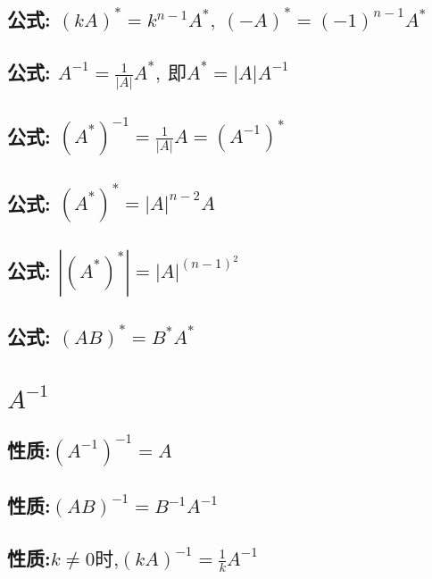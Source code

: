 \documentclass[UTF8]{ctexart}
\begin{document}
		\subsection{公式: $\left( kA \right) ^*=k^{n-1}A^*,\ \left( -A \right) ^*=\left( -1 \right) ^{n-1}A^*			$} 
		

		\subsection{公式: $A^{-1}=\frac{1}{\left| A \right|}A^*,\ \text{即}A^*=\left| A \right|A^{-1}			$} 
		

		\subsection{公式: $\left( A^* \right) ^{-1}=\frac{1}{\left| A \right|}A=\left( A^{-1} \right) ^*			$} 
		

		\subsection{公式: $\left( A^* \right) ^*=\left| A \right|^{n-2}A			$} 
		

		\subsection{公式: $\left| \left( A^* \right) ^* \right|=\left| A \right|^{\left( n-1 \right) ^2}			$} 
		

		\subsection{公式: $\left( AB \right) ^*=B^*A^*$} 
		

	
	
	
	
	\section{$A^{-1}$}
		\subsection{性质:$\left( A^{-1} \right) ^{-1}=A$}
		
		\subsection{性质:$\left( AB \right) ^{-1}=B^{-1}A^{-1}$}
		
		\subsection{性质:$k\ne 0\text{时,}\left( kA \right) ^{-1}=\frac{1}{k}A^{-1}$}
		
\end{document}
